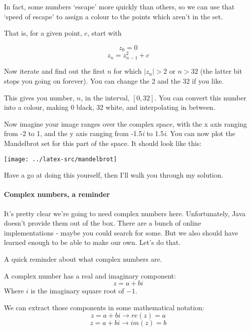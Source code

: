 \documentclass{article}
\begin{document}
        In fact, some numbers `escape' more quickly than others, so we can use that `speed of escape' to assign a colour to the points
        which aren't in the set.
        
        That is, for a given point, $c$, start with 
        
        $$z_0 = 0$$
        $$z_n = z_{n-1}^2 + c$$
        
        Now iterate and find out the first $n$ for which $|z_n| > 2$ or $n > 32$ (the latter bit stops you going on forever). You can
        change the 2 and the 32 if you like.
        
        This gives you number, $n$, in the interval, $[0,32]$. You can convert this number into a colour, making 0 black, 32 white, and
        interpolating in between.
        
        Now imagine your image ranges over the complex space, with the x axis ranging from -2 to 1, and the y axis ranging from
        -1.5\emph{i} to 1.5\emph{i}. You can now plot the Mandelbrot set for this part of the space. It should look like this:
        
        \begin{center}
            \texttt{[image: ../latex-src/mandelbrot]}
        \end{center}
        
        Have a go at doing this yourself, then I'll walk you through my solution.
        
        \newpage
        \paragraph{Complex numbers, a reminder}
            It's pretty clear we're going to need complex numbers here. Unfortunately, Java doesn't provide them out of the box. There are
            a bunch of online implementations - maybe you could search for some. But we also should have learned enough to be able to make
            our own. Let's do that.
            
            A quick reminder about what complex numbers are.
            
            A complex number has a real and imaginary component: 
            $$z = a + bi$$
            Where $i$ is the imaginary square root of $-1$.
            
            We can extract those components in some mathematical notation: 
            $$z = a + bi \rightarrow re(z) = a$$
            $$z = a + bi \rightarrow im(z) = b$$
            
\end{document}
